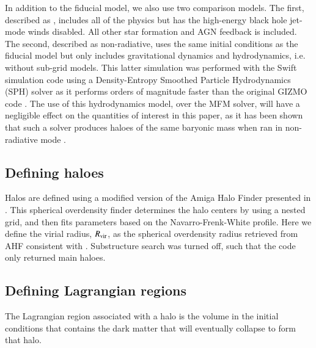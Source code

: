 In addition to the fiducial model, we also use two comparison models. The
first, described as \nojet{}, includes all of the \simba{} physics but has
the high-energy black hole jet-mode winds disabled. All other star formation
and AGN feedback is included. The second, described as non-radiative, uses
the same initial conditions as the fiducial model but only includes
gravitational dynamics and hydrodynamics, i.e. without sub-grid models. This
latter simulation was performed with the {\sc Swift} simulation code
\citep{Schaller2016} using a Density-Entropy Smoothed Particle Hydrodynamics
(SPH) solver as it performs orders of magnitude faster than the original
GIZMO code \citep{Borrow2018}. The use of this hydrodynamics model, over the
MFM solver, will have a negligible effect on the quantities of interest in
this paper, as it has been shown that such a solver produces haloes of the
same baryonic mass when ran in non-radiative mode \citep[see
e.g.][]{Sembolini2016}.

\subsection{Defining haloes}

Halos are defined using a modified version of the Amiga Halo Finder
\citep[AHF, ][]{Gill2004, Knollmann2009} presented in \citet{Muratov2015}.
This spherical overdensity finder determines the halo centers by using a
nested grid, and then fits parameters based on the Navarro-Frenk-White
\citep[NFW, ][]{Navarro1995} profile. Here we define the virial radius,
$R_{\rm vir}$, as the spherical overdensity radius retrieved from AHF consistent
with \citet{Bryan1998}. Substructure search was turned off, such that the
code only returned main haloes.

\subsection{Defining Lagrangian regions}

The Lagrangian region associated with a halo is the volume in the initial conditions
that contains the dark matter that will eventually collapse to form that halo.

